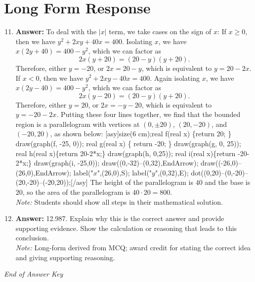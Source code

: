 \documentclass[12pt]{article}
\begin{document}
\section*{Long Form Response}
\begin{enumerate}[label=\arabic*.]
\setcounter{enumi}{10}
\item \textbf{Answer:} To deal with the $|x|$ term, we take cases on the sign of $x$: If $x \ge 0$, then we have $y^2+2 xy+40 x=400$. Isolating $x$, we have $x(2 y+40) = 400-y^2$, which we can factor as \[2 x(y+20) = (20-y)(y+20).\]Therefore, either $y=-20$, or $2 x=20-y$, which is equivalent to $y=20-2 x$. If $x < 0$, then we have $y^2+2 xy-40 x=400$. Again isolating $x$, we have $x(2 y-40) = 400-y^2$, which we can factor as \[2 x(y-20) = (20-y)(y+20).\]Therefore, either $y=20$, or $2 x=-y-20$, which is equivalent to $y=-20-2 x$. Putting these four lines together, we find that the bounded region is a parallelogram with vertices at $(0, \pm 20)$, $(20, -20)$, and $(-20, 20)$, as shown below: [asy]size(6 cm);real f(real x) \{return 20; \} draw(graph(f, -25, 0)); real g(real x) \{ return -20; \} draw(graph(g, 0, 25)); real h(real x)\{return 20-2*x;\} draw(graph(h, 0,25)); real i(real x)\{return -20-2*x;\} draw(graph(i, -25,0)); draw((0,-32)--(0,32),EndArrow); draw((-26,0)--(26,0),EndArrow); label("$x$",(26,0),S); label("$y$",(0,32),E); dot((0,20)--(0,-20)--(20,-20)--(-20,20));[/asy] The height of the parallelogram is $40$ and the base is $20$, so the area of the parallelogram is $40 \cdot 20 = \boxed{800}$.
\\ \textit{Note:} Students should show all steps in their mathematical solution.
\item \textbf{Answer:} 12.987. Explain why this is the correct answer and provide supporting evidence. Show the calculation or reasoning that leads to this conclusion.
\\ \textit{Note:} Long-form derived from MCQ; award credit for stating the correct idea and giving supporting reasoning.
\end{enumerate}

\vfill
\noindent\textit{End of Answer Key}
\end{document}
